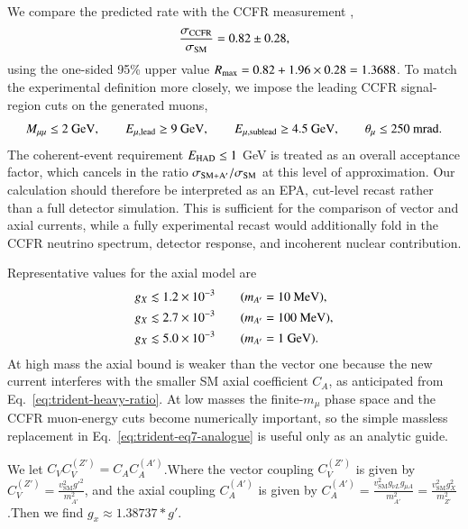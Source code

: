 \documentclass[onecolumn, aps, nofootinbib, prd, preprint, floats, floatfix, amsmath, amssymb, superscriptaddress, preprintnumbers]{revtex4-1}
\begin{document}
We compare the predicted rate with the CCFR measurement \cite{CCFR:1991lpl},
\begin{equation}
\frac{\sigma_{\rm CCFR}}{\sigma_{\rm SM}}=0.82\pm0.28,
\label{eq:ccfr-ratio}
\end{equation}
using the one-sided 95\% upper value \(R_{\rm max}=0.82+1.96\times0.28=1.3688\). To match the experimental definition more closely, we impose the leading CCFR signal-region cuts on the generated muons,
\begin{equation}
M_{\mu\mu}\le2~{\rm GeV},\qquad
E_{\mu,{\rm lead}}\ge9~{\rm GeV},\qquad
E_{\mu,{\rm sublead}}\ge4.5~{\rm GeV},\qquad
\theta_{\mu}\le250~{\rm mrad}.
\label{eq:ccfr-cuts}
\end{equation}
The coherent-event requirement \(E_{\rm HAD}\le1\) GeV is treated as an overall acceptance factor, which cancels in the ratio \(\sigma_{\rm SM+A'}/\sigma_{\rm SM}\) at this level of approximation. Our calculation should therefore be interpreted as an EPA, cut-level recast rather than a full detector simulation. This is sufficient for the comparison of vector and axial currents, while a fully experimental recast would additionally fold in the CCFR neutrino spectrum, detector response, and incoherent nuclear contribution.


Representative values for the axial model are
\begin{align}
g_X &\lesssim 1.2\times10^{-3}\qquad (m_{A'}=10~{\rm MeV}),\nonumber\\
g_X &\lesssim 2.7\times10^{-3}\qquad (m_{A'}=100~{\rm MeV}),\nonumber\\
g_X &\lesssim 5.0\times10^{-3}\qquad (m_{A'}=1~{\rm GeV}).
\label{eq:trident-axial-numbers}
\end{align}
At high mass the axial bound is weaker than the vector one because the new current interferes with the smaller SM axial coefficient \(C_A\), as anticipated from Eq.~\eqref{eq:trident-heavy-ratio}. At low masses the finite-\(m_\mu\) phase space and the CCFR muon-energy cuts become numerically important, so the simple massless replacement in Eq.~\eqref{eq:trident-eq7-analogue} is useful only as an analytic guide.

We let $C_VC_V^{(Z')}=C_AC_A^{(A')}$.Where the vector coupling \(C_V^{(Z')}\) is given by \(C_{V}^{(Z')}  = \frac{v_{\text{SM}}^2 g'^2 }{m_{A'}^2}\), and the axial coupling \(C_A^{(A')}\) is given by \(C_{A}^{(A')} = \frac{v_{\text{SM}}^2 g_{\nu L} g_{\mu A}}{m_{A'}^2} = \frac{v_{\text{SM}}^2 g_X^2 }{m_{Z'}^2} \).Then we find $g_x \approx 1.38737*g'$.
\end{document}
